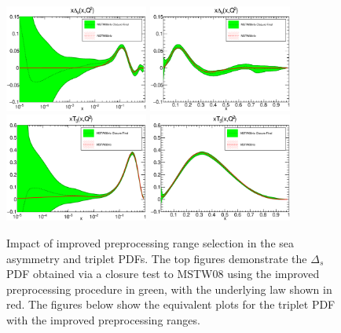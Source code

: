 \begin{figure}[!]
\centering
\includegraphics[width=0.42\textwidth]{7-PostLHC/figs/PreprocFixed/pdf_xDs_log_others.eps}
\includegraphics[width=0.42\textwidth]{7-PostLHC/figs/PreprocFixed/pdf_xDs_others.eps}
\includegraphics[width=0.42\textwidth]{7-PostLHC/figs/PreprocFixed/pdf_xT3_log_others.eps}
\includegraphics[width=0.42\textwidth]{7-PostLHC/figs/PreprocFixed/pdf_xT3_others.eps}
\caption[Impact of improved preprocessing range selection in the sea asymmetry and triplet PDFs]{Impact of improved preprocessing range selection in the sea asymmetry and triplet PDFs. The top figures demonstrate the $\Delta_s$ PDF obtained via a closure test to MSTW08 using the improved preprocessing procedure in green, with the underlying law shown in red. The figures below show the equivalent plots for the triplet PDF with the improved preprocessing ranges.}
\label{fig:preproc3}
\end{figure}
\clearpage

